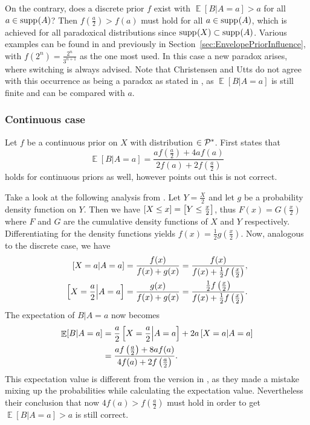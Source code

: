 \documentclass[a4paper]{report}
\theoremstyle{plain}
\theoremstyle{definition}
\theoremstyle{remark}
\numberwithin{equation}{chapter}
\let\P\relax
\DeclareMathOperator{\P}{\mathbb{P}}
\DeclareMathOperator{\E}{\mathbb{E}}
\DeclareMathOperator{\1}{\mathbbm{1}}
\DeclareMathOperator{\supp}{supp}
\newcommand{\Pmod}{\mathcal{P}^*}
\begin{document}
On the contrary, does a discrete prior $f$ exist with $\E[B|A=a]>a$ for all $a\in\supp_{\P}(A)$? Then $f\left(\frac{a}{2}\right)>f(a)$ must hold for all $a\in\supp_{\P}(A)$, which is achieved for all paradoxical distributions since $\supp_{\P}(X)\subset\supp_{\P}(A)$. Various examples can be found in \cite{Christensen93a,Linzer94,Broome95} and previously in Section~\ref{sec:EnvelopePriorInfluence}, with $f(2^n)=\frac{2^n}{3^{n+1}}$ as the one most used. In this case a new paradox arises, where switching is always advised. Note that Christensen and Utts do not agree with this occurrence as being a paradox as stated in \cite{Christensen93a}, as $\E[B|A=a]$ is still finite and can be compared with $a$.

\subsubsection{Continuous case}
Let $f$ be a continuous prior on $X$ with distribution $\P\in\Pmod$. First \cite{Christensen92} states that
\begin{equation}
\E[B|A=a]=\frac{af\left(\frac{a}{2}\right)+4af(a)}{2f(a)+2f\left(\frac{a}{2}\right)}
\end{equation}
holds for continuous priors as well, however \cite{Christensen96} points out this is not correct.

Take a look at the following analysis from \cite{Christensen96}. Let $Y=\frac{X}{2}$ and let $g$ be a probability density function on $Y$. Then we have $\P[X\leq x]=\P\left[Y\leq \frac{x}{2}\right]$, thus $F(x)=G\left(\frac{x}{2}\right)$ where $F$ and $G$ are the cumulative density functions of $X$ and $Y$ respectively. Differentiating for the density functions yields $f(x)=\frac{1}{2}g\left(\frac{x}{2}\right)$. Now, analogous to the discrete case, we have
\begin{align}
\P[X=a|A=a]&=\frac{f(x)}{f(x)+g(x)}=\frac{f(x)}{f(x)+\frac{1}{2}f\left(\frac{x}{2}\right)},\\
\P\left[X=\frac{a}{2}\middle|A=a\right]&=\frac{g(x)}{f(x)+g(x)}=\frac{\frac{1}{2}f\left(\frac{x}{2}\right)}{f(x)+\frac{1}{2}f\left(\frac{x}{2}\right)}.
\end{align}
The expectation of $B|A=a$ now becomes
\begin{align}
\E[B|A=a]&=\frac{a}{2}\P\left[X=\frac{a}{2}\middle|A=a\right]+2a\P\left[X=a\middle|A=a\right]\\
&=\frac{af\left(\frac{a}{2}\right)+8af(a)}{4f(a)+2f\left(\frac{a}{2}\right)}.
\end{align}
This expectation value is different from the version in \cite{Christensen96}, as they made a mistake mixing up the probabilities while calculating the expectation value. Nevertheless their conclusion that now $4f(a)>f\left(\frac{a}{2}\right)$ must hold in order to get $\E[B|A=a]>a$ is still correct.
\end{document}
